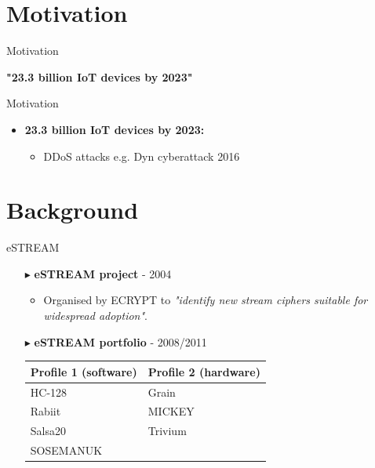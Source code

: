 \documentclass[10pt, compress]{beamer}
\begin{document}
    \section{Motivation}

    \begin{frame}{Motivation}
        \vspace{1cm}
        \begin{center}
            \centering
            {\LARGE\textbf{"23.3 billion IoT devices by 2023"}}\cite{iot}
        \end{center}
    \end{frame}

    \begin{frame}{Motivation}
        \begin{itemize}[itemsep=0.5cm]
            \item \textbf{23.3 billion IoT devices by 2023:}
            \begin{itemize}
                \item DDoS attacks e.g. Dyn cyberattack 2016
            \end{itemize}
        \end{itemize}
    \end{frame}

    \section{Background}

    \begin{frame}{eSTREAM}
        \begin{itemize}[itemsep=0.5cm]
            \item[$\blacktriangleright$] \textbf{eSTREAM project} - 2004
            \begin{itemize}
                \item Organised by ECRYPT to \textit{"identify new stream ciphers suitable for widespread adoption"}.
            \end{itemize}
            \item[$\blacktriangleright$] \textbf{eSTREAM portfolio} - 2008/2011
            \begin{table}
                \centering
                \begin{tabular}{l|l}
                    Profile 1 (software) & Profile 2 (hardware)\\\hline
                    HC-128 & Grain\\
                    Rabiit & MICKEY\\
                    Salsa20 & Trivium\\
                    SOSEMANUK &
                \end{tabular}
            \end{table}
        \end{itemize}
    \end{frame}
\end{document}
